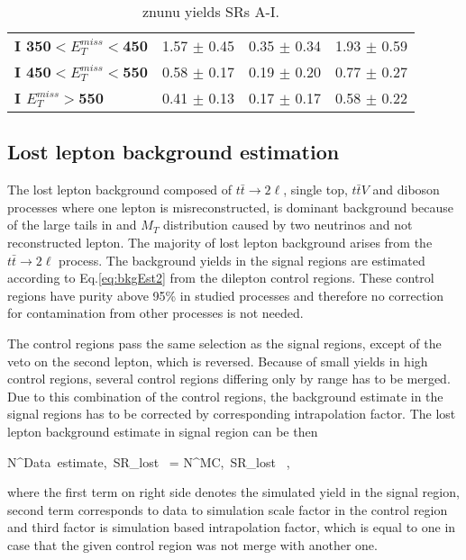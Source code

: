 \begin{table}[h]
\begin{center}
\begin{tabular}{|l|ccc|}
\textbf{ I 350$<E_T^{miss}<$450}         & 1.57 $\pm$ 0.45       & 0.35 $\pm$ 0.34       & 1.93 $\pm$ 0.59       \\
\textbf{ I 450$<E_T^{miss}<$550}         & 0.58 $\pm$ 0.17       & 0.19 $\pm$ 0.20       & 0.77 $\pm$ 0.27       \\
\textbf{ I $E_T^{miss}>$550}     & 0.41 $\pm$ 0.13       & 0.17 $\pm$ 0.17       & 0.58 $\pm$ 0.22       \\
\hline
\end{tabular}
\caption[Table caption text]{znunu yields SRs A-I. }
\label{tab:YZnunu}
\end{center}
\end{table}


\subsection{Lost lepton background estimation}

The lost lepton background composed of $t\bar{t} \to 2\ell$, single top, $t\bar{t}V$ and diboson processes where one lepton is misreconstructed, is dominant background because of the large tails in \MET and $M_{T}$ distribution caused by two neutrinos and not reconstructed lepton. The majority of lost lepton background arises from the $t\bar{t} \to 2\ell$ process. The background yields in the signal regions are  estimated according to Eq.\ref{eq:bkgEst2} from the dilepton control regions. These control regions have purity above 95\% in studied processes and therefore no correction for contamination from other processes is not needed. 

The control regions pass the same selection as the signal regions, except of the veto on the second lepton, which is reversed. Because of small yields in high \MET control regions, several control regions differing only by \MET range has to be merged. Due to this combination of the control regions, the background estimate in the signal regions has to be corrected by corresponding intrapolation factor. The lost lepton background estimate in signal region can be then 

{
N^{Data~estimate,~SR}_{lost~\ell}  = N^{MC,~SR}_{lost~\ell} \times  {} \times {},
}

where the first term on right side denotes the simulated yield in the signal region, second term corresponds to data to simulation scale factor in the control region and third factor is simulation based intrapolation factor, which is equal to one in case that the given control region was not merge with another one.

